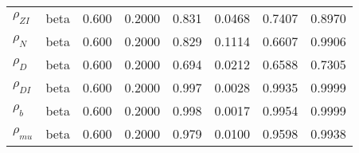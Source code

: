 \begin{center}
\begin{longtable}{llcccccc}
${\rho_{ZI}}$ & beta &   0.600 & 0.2000 &   0.831& 0.0468 &  0.7407 &  0.8970 \\ 
${\rho_N}$ & beta &   0.600 & 0.2000 &   0.829& 0.1114 &  0.6607 &  0.9906 \\ 
${\rho_D}$ & beta &   0.600 & 0.2000 &   0.694& 0.0212 &  0.6588 &  0.7305 \\ 
${\rho_{DI}}$ & beta &   0.600 & 0.2000 &   0.997& 0.0028 &  0.9935 &  0.9999 \\ 
${\rho_b}$ & beta &   0.600 & 0.2000 &   0.998& 0.0017 &  0.9954 &  0.9999 \\ 
${\rho_{mu}}$ & beta &   0.600 & 0.2000 &   0.979& 0.0100 &  0.9598 &  0.9938 \\ 
\end{longtable}
 \end{center}

